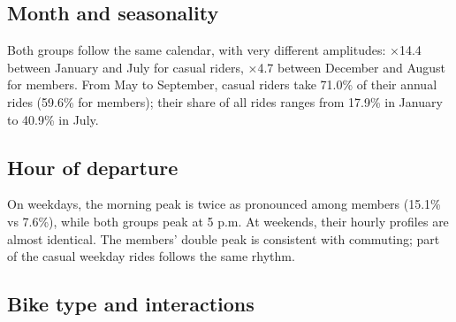 \subsection{Month and seasonality}

\begin{table}[!htb]
\caption{Rides and median duration by month of departure}
\label{tab:months}
\small

\par{}
\end{table}

\Mes{} Both groups follow the same calendar, with very different amplitudes: ×14.4 between January and July for casual riders, ×4.7 between December and August for members. From May to September, casual riders take 71.0\% of their annual rides (59.6\% for members); their share of all rides ranges from 17.9\% in January to 40.9\% in July.

\subsection{Hour of departure}

\begin{table}[!htb]
\caption{Hourly indicators}
\label{tab:hours}
\small

\par{}
\end{table}

\Mes{} On weekdays, the morning peak is twice as pronounced among members (15.1\% vs 7.6\%), while both groups peak at 5 p.m. At weekends, their hourly profiles are almost identical. \Int{} The members' double peak is consistent with commuting; part of the casual weekday rides follows the same rhythm.

\subsection{Bike type and interactions}

\begin{table}[!htb]
\caption{Bike type and type of day}
\label{tab:bikes}
\small

\par{}
\end{table}

